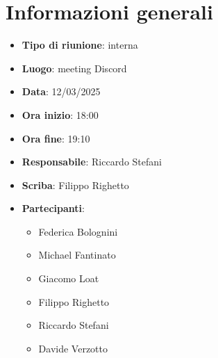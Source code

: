 


\section{Informazioni generali}

\begin{itemize}
    \item \textbf{Tipo di riunione}: interna
    \item \textbf{Luogo}: meeting Discord
    \item \textbf{Data}: 12/03/2025
    \item \textbf{Ora inizio}: 18:00
    \item \textbf{Ora fine}: 19:10
    \item \textbf{Responsabile}: Riccardo Stefani
    \item \textbf{Scriba}: Filippo Righetto
    \item \textbf{Partecipanti}:
    \begin{itemize}
        \item Federica Bolognini
        \item Michael Fantinato
        \item Giacomo Loat
        \item Filippo Righetto
        \item Riccardo Stefani
        \item Davide Verzotto
    \end{itemize}
\end{itemize}

